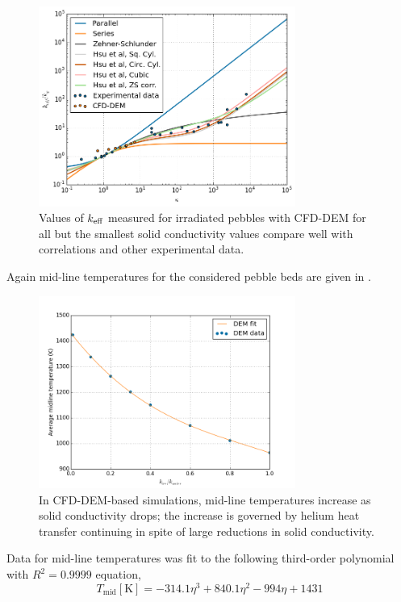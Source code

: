 \begin{figure}[ht]
    \centering
    \includegraphics[width = 0.75\textwidth]{figures/irradiated/keff-kappa-irradiated.png}
    \caption{Values of $k_\text{eff}$ measured for irradiated pebbles with CFD-DEM for all but the smallest solid conductivity values compare well with correlations and other experimental data.}\label{fig:irrad-keff-kappa}
\end{figure}
\FloatBarrier




Again mid-line temperatures for the considered pebble beds are given in .
\begin{figure}[ht]
    \centering
    \includegraphics[width = 0.75\textwidth]{figures/irradiated/Tmid-plots-cfd-q.png}
    \caption{In CFD-DEM-based simulations, mid-line temperatures increase as solid conductivity drops; the increase is governed by helium heat transfer continuing in spite of large reductions in solid conductivity.}\label{fig:irrad-mids-cfd-q}
\end{figure}

Data for mid-line temperatures was fit to the following third-order polynomial with $R^2 = 0.9999$ equation,
\begin{equation}
T_\text{mid}[\si{\kelvin}] = -314.1 \eta^3 + 840.1 \eta^2 - 994 \eta + 1431
\end{equation}

